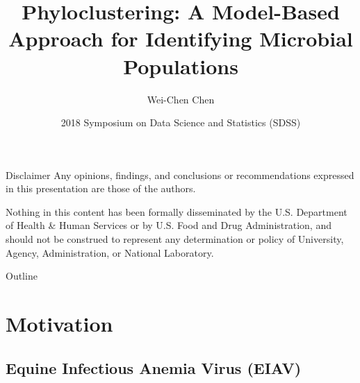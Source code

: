 \documentclass{beamer}
\title[Phyloclustering]{Phyloclustering: A Model-Based Approach for Identifying Microbial Populations}
\author{\large Wei-Chen Chen}
\institute{\normalsize \pbdR Core Team}
\date{\small 2018 Symposium on Data Science and Statistics (SDSS)}
\begin{document}
\begin{frame}
  \titlepage
\end{frame}

\begin{frame}{Disclaimer}
Any opinions, findings, and conclusions or recommendations expressed in
this presentation are those of the authors.

\vspace{\baselineskip}

Nothing in this content has been formally disseminated by the U.S. Department
of Health \& Human Services or by U.S. Food and Drug Administration,
and should not be construed to represent any determination
or policy of University, Agency, Administration, or National Laboratory.
\end{frame}


\begin{frame}{Outline}
  \tableofcontents
\end{frame}


\section{Motivation}
\subsection{Equine Infectious Anemia Virus (EIAV)}
\end{document}
